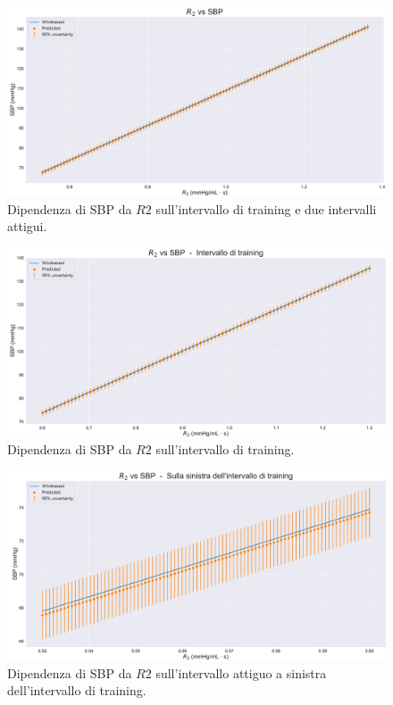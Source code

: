 \vspace{1cm}

\begin{figure}[!htb]
    \centering
    \includegraphics[width=1\textwidth]{images/Training (risultati)/SBP/SBP - R2 - full.pdf}
    \caption{Dipendenza di SBP da $R2$ sull'intervallo di training e due intervalli attigui.}
    \label{SBP - R2 - full}
\end{figure}

\vspace{0.32cm}

\begin{figure}[!htb]
    \centering
    \includegraphics[width=1\textwidth]{images/Training (risultati)/SBP/SBP - R2 - training.pdf}
    \caption{Dipendenza di SBP da $R2$ sull'intervallo di training.}
    \label{SBP - R2 - training}
\end{figure}

\begin{figure}
    \centering
    \includegraphics[width=1\textwidth]{images/Training (risultati)/SBP/SBP - R2 - sx.pdf}
    \caption{Dipendenza di SBP da $R2$ sull'intervallo attiguo a sinistra dell'intervallo di training.}
    \label{SBP - R2 - sx}
\end{figure}




